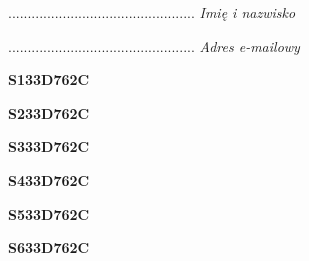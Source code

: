 \begin{turn}{90}\begin{minipage}{\linewidth} \vspace{20mm} ................................................  \textit{Imię i nazwisko}\end{minipage}\end{turn}

\begin{turn}{90}\begin{minipage}{\linewidth} \vspace{20mm} ................................................  \textit{Adres e-mailowy}\end{minipage}\end{turn}

\begin{turn}{90}\huge \begin{minipage}{\linewidth} \vspace{10mm}\textbf{S133D762C}\end{minipage}\end{turn}

\begin{turn}{90}\huge \begin{minipage}{\linewidth} \vspace{10mm}\textbf{S233D762C}\end{minipage}\end{turn}

\begin{turn}{90}\huge \begin{minipage}{\linewidth} \vspace{10mm}\textbf{S333D762C}\end{minipage}\end{turn}

\begin{turn}{90}\huge \begin{minipage}{\linewidth} \vspace{10mm}\textbf{S433D762C}\end{minipage}\end{turn}

\begin{turn}{90}\huge \begin{minipage}{\linewidth} \vspace{10mm}\textbf{S533D762C}\end{minipage}\end{turn}

\begin{turn}{90}\huge \begin{minipage}{\linewidth} \vspace{10mm}\textbf{S633D762C}\end{minipage}\end{turn}


